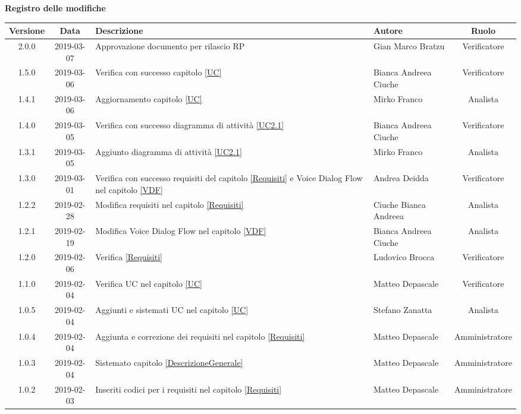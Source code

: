 	\begin{center}
		\textbf{Registro delle modifiche}
	\end{center}
	\begin{center}
		\begin{tabularx}{\textwidth}{|c|c|X|X|c|}
			\hline
			\textbf{Versione} & \textbf{Data} & \textbf{Descrizione} & \textbf{Autore} & \textbf{Ruolo} \\
			\hline
			2.0.0 & 2019-03-07 & Approvazione documento per rilascio RP & Gian Marco Bratzu & Verificatore \\
			\hline
			1.5.0 & 2019-03-06 & Verifica con successo capitolo \ref{UC} & Bianca Andreea Ciuche & Verificatore \\
			\hline
			1.4.1 & 2019-03-06 & Aggiornamento capitolo \ref{UC} & Mirko Franco & Analista \\
			\hline
			1.4.0 & 2019-03-05 & Verifica con successo diagramma di attività \ref{UC2.1} & Bianca Andreea Ciuche & Verificatore \\
			\hline
			1.3.1 & 2019-03-05 & Aggiunto diagramma di attività \ref{UC2.1} & Mirko Franco & Analista \\
			\hline
			1.3.0 & 2019-03-01 & Verifica con successo requisiti del capitolo \ref{Requisiti} e Voice Dialog Flow nel capitolo \ref{VDF} & Andrea Deidda & Verificatore \\
			\hline
			1.2.2 & 2019-02-28 & Modifica requisiti nel capitolo \ref{Requisiti}& Ciuche Bianca Andreea & Analista \\
			\hline
			1.2.1 & 2019-02-19 & Modifica Voice Dialog Flow  nel capitolo \ref{VDF} & Bianca Andreea Ciuche & Analista  \\
			\hline
			1.2.0 & 2019-02-06 & Verifica \ref{Requisiti}& Ludovico Brocca & Verificatore \\
			\hline
			1.1.0 & 2019-02-04 & Verifica UC nel capitolo \ref{UC}& Matteo Depascale & Verificatore\\
			\hline
			1.0.5 & 2019-02-04 & Aggiunti e sistemati UC nel capitolo \ref{UC}& Stefano Zanatta & Analista\\
			\hline
			1.0.4 & 2019-02-04 & Aggiunta e correzione dei requisiti nel capitolo \ref{Requisiti}& Matteo Depascale & Amministratore\\
			\hline
			1.0.3 & 2019-02-04 & Sistemato capitolo \ref{DescrizioneGenerale}& Matteo Depascale & Amministratore\\
			\hline
			1.0.2 & 2019-02-03 & Inseriti codici per i requisiti nel capitolo \ref{Requisiti}& Matteo Depascale & Amministratore\\

\end{tabularx}
\end{center}

